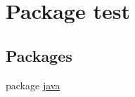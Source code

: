 \hypertarget{namespacetest}{\section{Package test}
\label{namespacetest}
}
\subsection*{Packages}
\begin{DoxyCompactItemize}
\item 
package \hyperlink{namespacetest_1_1java}{java}
\end{DoxyCompactItemize}
